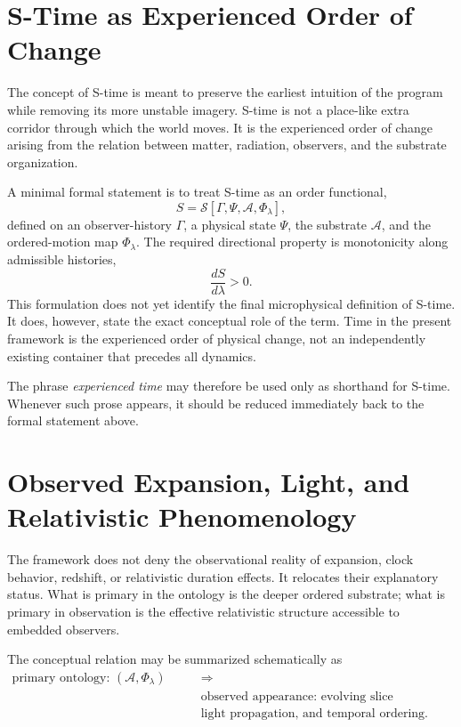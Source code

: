 \documentclass[11pt]{article}
\newcommand{\Order}{\mathcal{S}}
\newcommand{\Sub}{\mathcal{A}}
\begin{document}
\section{S-Time as Experienced Order of Change}

The concept of S-time is meant to preserve the earliest intuition of the program while removing its more unstable imagery. S-time is not a place-like extra corridor through which the world moves. It is the experienced order of change arising from the relation between matter, radiation, observers, and the substrate organization.

A minimal formal statement is to treat S-time as an order functional,
\[
S = \Order[\Gamma,\Psi,\Sub,\Phi_{\lambda}],
\]
defined on an observer-history \(\Gamma\), a physical state \(\Psi\), the substrate \(\Sub\), and the ordered-motion map \(\Phi_{\lambda}\). The required directional property is monotonicity along admissible histories,
\[
\frac{dS}{d\lambda} > 0.
\]
This formulation does not yet identify the final microphysical definition of S-time. It does, however, state the exact conceptual role of the term. Time in the present framework is the experienced order of physical change, not an independently existing container that precedes all dynamics.

The phrase \emph{experienced time} may therefore be used only as shorthand for S-time. Whenever such prose appears, it should be reduced immediately back to the formal statement above.

\section{Observed Expansion, Light, and Relativistic Phenomenology}

The framework does not deny the observational reality of expansion, clock behavior, redshift, or relativistic duration effects. It relocates their explanatory status. What is primary in the ontology is the deeper ordered substrate; what is primary in observation is the effective relativistic structure accessible to embedded observers.

The conceptual relation may be summarized schematically as
\[
\begin{aligned}
\text{primary ontology: } (\Sub,\Phi_{\lambda})
\qquad &\Longrightarrow \\
&\text{observed appearance: evolving slice geometry,} \\
&\text{light propagation, and temporal ordering}.
\end{aligned}
\]
\end{document}
